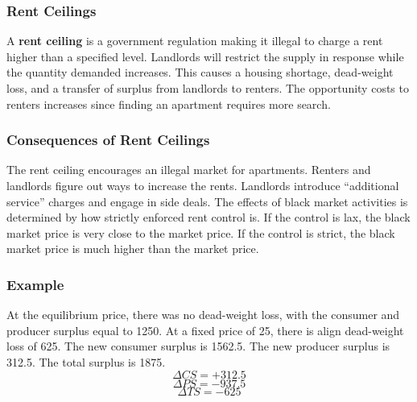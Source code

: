 \documentclass[letterpaper, 12pt]{article}
\begin{document}
\subsubsection{Rent Ceilings}
A \textbf{rent ceiling} is a government regulation making it illegal to charge
a rent higher than a specified level. Landlords will restrict the supply in
response while the quantity demanded increases. This causes a housing shortage,
dead-weight loss, and a transfer of surplus from landlords to renters. The
opportunity costs to renters increases since finding an apartment requires more
search.

\subsubsection{Consequences of Rent Ceilings}
The rent ceiling encourages an illegal market for apartments. Renters and
landlords figure out ways to increase the rents. Landlords introduce
``additional service'' charges and engage in side deals. The effects of black
market activities is determined by how strictly enforced rent control is.
If the control is lax, the black market price is very close to the market price.
If the control is strict, the black market price is much higher than the market
price.

\subsubsection{Example}
\begin{center}
\end{center}
At the equilibrium price, there was no dead-weight loss, with the consumer
and producer surplus equal to 1250. At a fixed price of 25, there is align
dead-weight loss of 625. The new consumer surplus is 1562.5. The new
producer surplus is 312.5. The total surplus is 1875.
\[ \Delta CS = +312.5 \]
\[ \Delta PS = -937.5 \]
\[ \Delta TS = -625 \]
\end{document}
